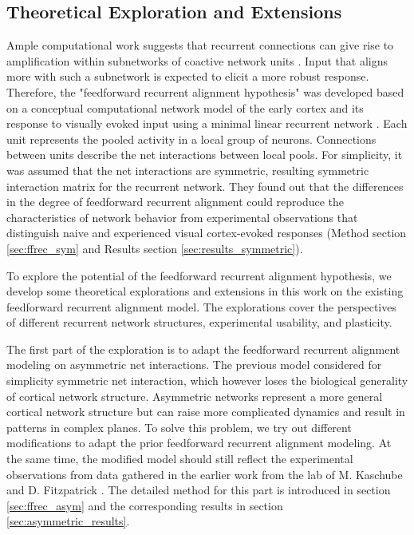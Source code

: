 \documentclass[11pt]{article}
\begin{document}
	\subsection{Theoretical Exploration and Extensions}
	Ample computational work suggests that recurrent connections can give rise to amplification within subnetworks of coactive network units \cite{abbott1994decoding, ben1995theory, douglas1995recurrent, miller2016canonical, christie2017cortical, peron2020recurrent}. Input that aligns more with such a subnetwork is expected to elicit a more robust response. 
	Therefore, the "feedforward recurrent alignment hypothesis" was developed based on a conceptual computational network model of the early cortex and its response to visually evoked input using a minimal linear recurrent network \cite{tragenap2023nature}. Each unit represents the pooled activity in a local group of neurons. Connections between units describe the net interactions between local pools. For simplicity, it was assumed that the net interactions are symmetric, resulting symmetric interaction matrix for the recurrent network. They found out that the differences in the degree of feedforward recurrent alignment could reproduce the characteristics of network behavior from experimental observations that distinguish naive and experienced visual cortex-evoked responses (Method section \ref{sec:ffrec_sym} and Results section \ref{sec:results_symmetric}). 
	
	To explore the potential of the feedforward recurrent alignment hypothesis, we develop some theoretical explorations and extensions in this work on the existing feedforward recurrent alignment model. The explorations cover the perspectives of different recurrent network structures, experimental usability, and plasticity. 
	
	The first part of the exploration is to adapt the feedforward recurrent alignment modeling on asymmetric net interactions. The previous model considered for simplicity symmetric net interaction, which however loses the biological generality of cortical network structure. Asymmetric networks represent a more general cortical network structure but can raise more complicated dynamics and result in patterns in complex planes. To solve this problem, we try out different modifications to adapt the prior feedforward recurrent alignment modeling. At the same time, the modified model should still reflect the experimental observations from data gathered in the earlier work from the lab of M. Kaschube and D. Fitzpatrick \cite{tragenap2023nature}. The detailed method for this part is introduced in section \ref{sec:ffrec_asym} and the corresponding results in section \ref{sec:asymmetric_results}. 
	
\end{document}
